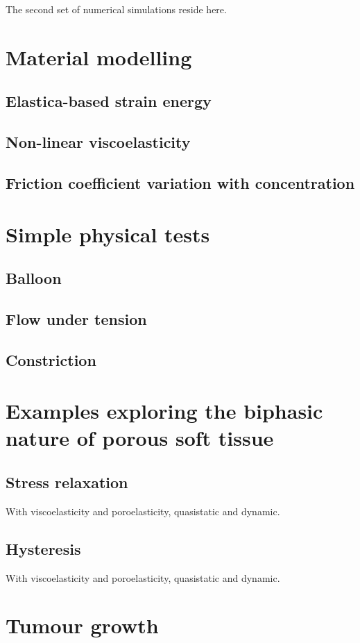 The second set of numerical simulations reside here.

\section{Material modelling}
\label{material-modelling}

\subsection{Elastica-based strain energy}
\label{elastica-stain-energy}

\subsection{Non-linear viscoelasticity}
\label{non-linear-viscoelasticity}

\subsection{Friction coefficient variation with concentration}
\label{variable-friction-coefficient}

\section{Simple physical tests}
\label{simple-physics}

\subsection{Balloon}
\label{balloon}

\subsection{Flow under tension}
\label{tenson-flow}

\subsection{Constriction}
\label{constriction-2}

\section{Examples exploring the biphasic nature of porous soft tissue}
\label{biphasic-examples-2}

\subsection{Stress relaxation}
\label{stress-relaxation}
With viscoelasticity and poroelasticity, quasistatic and dynamic.

\subsection{Hysteresis}
\label{hysteresis}
With viscoelasticity and poroelasticity, quasistatic and dynamic.

\section{Tumour growth}
\label{tumor-growth}
